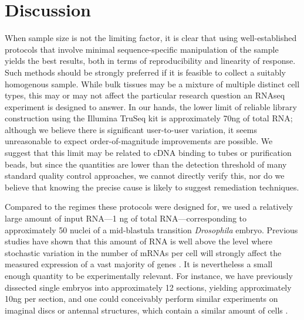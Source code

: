 \section{Discussion}


When sample size is not the limiting factor, it is clear that using well-established protocols that involve minimal sequence-specific manipulation of the sample yields the best results, both in terms of reproducibility and linearity of response. Such methods should be strongly preferred if it is feasible to collect a suitably homogenous sample. While bulk tissues may be a mixture of multiple distinct cell types, this may or may not affect the particular research question an RNAseq experiment is designed to answer.  In our hands, the lower limit of reliable library construction using the Illumina TruSeq kit is approximately 70ng of total RNA; although we believe there is significant user-to-user variation, it seems unreasonable to expect order-of-magnitude improvements are possible. We suggest that this limit may be related to cDNA binding to tubes or purification beads, but since the quantities are lower than the detection threshold of many standard quality control approaches, we cannot directly verify this, nor do we believe that knowing the precise cause is likely to suggest remediation techniques.


Compared to the regimes these protocols were designed for, we used a relatively large amount of input RNA---1 ng of total RNA---corresponding to approximately 50 nuclei of a mid-blastula transition {\em Drosophila} embryo. Previous studies have shown that this amount of RNA is well above the level where stochastic variation in the number of mRNAs per cell will strongly affect the measured expression of a vast majority of genes \cite{Marinov:2013fm}. It is nevertheless a small enough quantity to be experimentally relevant.  For instance, we have previously dissected single embryos into approximately 12 sections, yielding approximately 10ng per section\cite{Combs:2013jy}, and one could conceivably perform similar experiments on imaginal discs or antennal structures, which contain a similar amount of cells \cite{Klebes:2002ua,Hansson:2000cx}.
